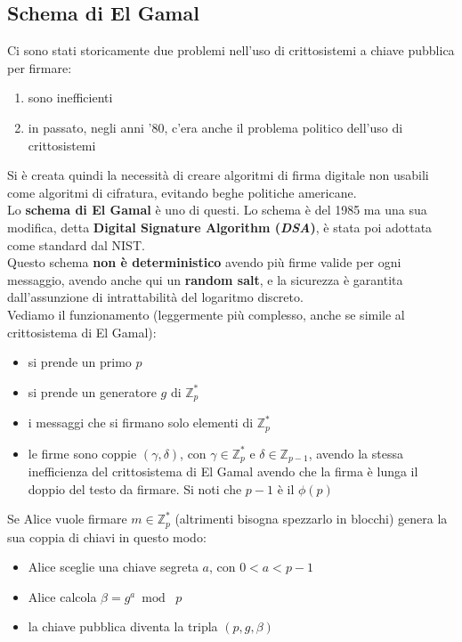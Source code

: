 \documentclass[a4paper,12pt, oneside]{book}
\begin{document}
\subsection{Schema di El Gamal}
Ci sono stati storicamente due problemi nell'uso di crittosistemi a chiave
pubblica per firmare: 
\begin{enumerate}
  \item sono inefficienti
  \item in passato, negli anni '80, c'era anche il problema politico dell'uso di
  crittosistemi 
\end{enumerate}
Si è creata quindi la necessità di creare algoritmi di firma digitale non
usabili come algoritmi di cifratura, evitando beghe politiche americane.\\
Lo \textbf{schema di El Gamal} è uno di questi. Lo schema è del 1985 ma una sua
modifica, detta \textbf{Digital Signature Algorithm (\textit{DSA})}, è stata poi
adottata come standard dal NIST.\\
Questo schema \textbf{non è deterministico} avendo più firme valide per ogni
messaggio, avendo anche qui un \textbf{random salt}, e la sicurezza è garantita
dall'assunzione di intrattabilità del logaritmo discreto.\\
Vediamo il funzionamento (leggermente più complesso, anche se simile al
crittosistema di El Gamal):
\begin{itemize}
  \item si prende un primo $p$
  \item si prende un generatore $g$ di $\mathbb{Z}_p^*$
  \item i messaggi che si firmano solo elementi di $\mathbb{Z}_p^*$
  \item le firme sono coppie $(\gamma,\delta)$, con $\gamma \in\mathbb{Z}_p^*$ e
  $\delta\in\mathbb{Z}_{p-1}$, avendo la stessa inefficienza del crittosistema
  di El Gamal avendo che la firma è lunga il doppio del testo da firmare. Si
  noti che $p-1$ è il $\phi(p)$
\end{itemize}
Se Alice vuole firmare $m\in\mathbb{Z}_p^*$ (altrimenti bisogna spezzarlo in
blocchi) genera la sua coppia di chiavi in questo modo:
\begin{itemize}
  \item Alice sceglie una chiave segreta $a$, con $0<a<p-1$
  \item Alice calcola $\beta=g^a\bmod\,\,p$
  \item la chiave pubblica diventa la tripla $(p,g,\beta)$
\end{itemize}
\end{document}
